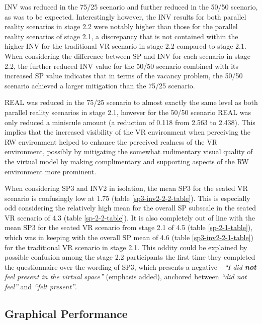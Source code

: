 INV was reduced in the 75/25 scenario and further reduced in the 50/50 scenario, as was to be expected. Interestingly however, the INV results for both parallel reality scenarios in stage 2.2 were notably higher than those for the parallel reality scenarios of stage 2.1, a discrepancy that is not contained within the higher INV for the traditional VR scenario in stage 2.2 compared to stage 2.1. When considering the difference between SP and INV for each scenario in stage 2.2, the further reduced INV value for the 50/50 scenario combined with its increased SP value indicates that in terms of the vacancy problem, the 50/50 scenario achieved a larger mitigation than the 75/25 scenario.

REAL was reduced in the 75/25 scenario to almost exactly the same level as both parallel reality scenarios in stage 2.1, however for the 50/50 scenario REAL was only reduced a miniscule amount (a reduction of 0.118 from 2.563 to 2.438). This implies that the increased visibility of the VR environment when perceiving the RW environment helped to enhance the perceived realness of the VR environment, possibly by mitigating the somewhat rudimentary visual quality of the virtual model by making complimentary and supporting aspects of the RW environment more prominent.

When considering SP3 and INV2 in isolation, the mean SP3 for the seated VR scenario is confusingly low at 1.75 (table \ref{sp3-inv2-2-2-table}). This is especially odd considering the relatively high mean for the overall SP subscale in the seated VR scenario of 4.3 (table \ref{sp-2-2-table}). It is also completely out of line with the mean SP3 for the seated VR scenario from stage 2.1 of 4.5 (table \ref{sp-2-1-table}), which was in keeping with the overall SP mean of 4.6 (table \ref{sp3-inv2-2-1-table}) for the traditional VR scenario in stage 2.1. This oddity could be explained by possible confusion among the stage 2.2 participants the first time they completed the questionnaire over the wording of SP3, which presents a negative - \textit{``I did \textbf{not} feel present in the virtual space''} (emphasis added), anchored between \textit{``did not feel''} and \textit{``felt present''}.


\subsection{Graphical Performance}
\label{stage-2-2-framerates}

